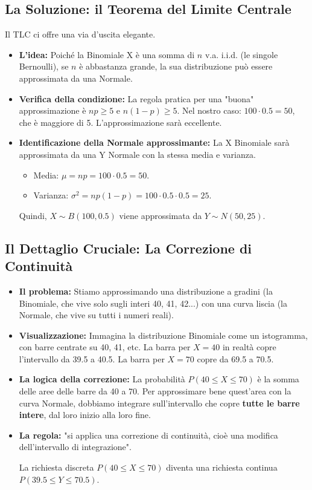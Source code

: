 \documentclass[a4paper, 11pt]{article}
\theoremstyle{definition}
\begin{document}
\subsection{La Soluzione: il Teorema del Limite Centrale}
Il TLC ci offre una via d'uscita elegante.
\begin{itemize}
    \item \textbf{L'idea:} Poiché la Binomiale X è una somma di $n$ v.a. i.i.d. (le singole Bernoulli), se $n$ è abbastanza grande, la sua distribuzione può essere approssimata da una Normale.

    \item \textbf{Verifica della condizione:} La regola pratica per una "buona" approssimazione è $np \ge 5$ e $n(1-p) \ge 5$.
    Nel nostro caso: $100 \cdot 0.5 = 50$, che è maggiore di 5. L'approssimazione sarà eccellente.

    \item \textbf{Identificazione della Normale approssimante:}
    La X Binomiale sarà approssimata da una Y Normale con la stessa media e varianza.
    \begin{itemize}
        \item Media: $\mu = np = 100 \cdot 0.5 = 50$.
        \item Varianza: $\sigma^2 = np(1-p) = 100 \cdot 0.5 \cdot 0.5 = 25$.
    \end{itemize}
    Quindi, $X \sim B(100, 0.5)$ viene approssimata da $Y \sim N(50, 25)$.
\end{itemize}

\subsection{Il Dettaglio Cruciale: La Correzione di Continuità}
\begin{itemize}
    \item \textbf{Il problema:} Stiamo approssimando una distribuzione a gradini (la Binomiale, che vive solo sugli interi 40, 41, 42...) con una curva liscia (la Normale, che vive su tutti i numeri reali).

    \item \textbf{Visualizzazione:} Immagina la distribuzione Binomiale come un istogramma, con barre centrate su 40, 41, etc. La barra per $X=40$ in realtà copre l'intervallo da 39.5 a 40.5. La barra per $X=70$ copre da 69.5 a 70.5.

    \item \textbf{La logica della correzione:} La probabilità $P(40 \le X \le 70)$ è la somma delle aree delle barre da 40 a 70. Per approssimare bene quest'area con la curva Normale, dobbiamo integrare sull'intervallo che copre \textbf{tutte le barre intere}, dal loro inizio alla loro fine.

    \item \textbf{La regola:} "si applica una correzione di continuità, cioè una modifica dell'intervallo di integrazione".
    \begin{formulabox}
        La richiesta discreta $P(40 \le X \le 70)$ diventa una richiesta continua $P(39.5 \le Y \le 70.5)$.
    \end{formulabox}
\end{itemize}
\end{document}
